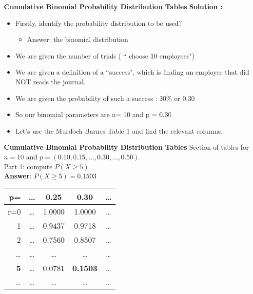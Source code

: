\documentclass[a4]{beamer}
\begin{document}
{
\textbf{Cumulative Binomial Probability Distribution Tables}
\textbf{Solution :}

\begin{itemize}
\item
Firstly, identify the probability distribution to be used?
    \begin{itemize}
    \item
    Answer: the binomial distribution
    \end{itemize}
\item We are given the number of trials ( `` choose 10 employees")

\item We are given a definition of a ``success", which is finding an employee that did NOT reads the journal.

\item We are given the probability of such a success : 30\%  or 0.30

\item So our binomial parameters are n= 10 and p = 0.30

\item Let's use the Murdoch Barnes Table 1 and find the relevant columns.

\end{itemize}
}



{
\textbf{Cumulative Binomial Probability Distribution Tables}
\normalsize
Section of tables for $n=10$ and $p = (0.10,0.15,\ldots,0.30, \ldots, 0.50)$\\
\bigskip
Part 1:  compute $P(X \geq 5)$ \\ \textbf{Answer}: $P(X \geq 5)  = 0.1503$

\begin{center}
\begin{tabular}{|r||c|c|c|c|}
  \hline
  p= & \ldots & 0.25 & \textbf{0.30} &  \ldots\\ \hline \hline
  r=0 & \ldots & 1.0000 & 1.0000 & \ldots\\
  1 & \ldots & 0.9437 & 0.9718 & \ldots \\
  2 & \ldots & 0.7560 & 0.8507 &\ldots \\
  \ldots & \ldots & \ldots & \ldots&\ldots \\
  \textbf{5} & \ldots & 0.0781 & \alert{\textbf{0.1503}} &\ldots \\
 \ldots & \ldots & \ldots & \ldots&\ldots \\
  \hline
\end{tabular}
\end{center}

}
\end{document}
